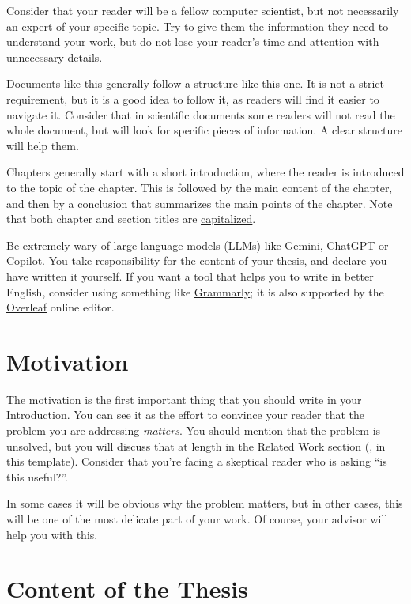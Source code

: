 Consider that your reader will be a fellow computer scientist, but not necessarily an expert
of your specific topic. Try to give them the information they need to understand your work, but
do not lose your reader's time and attention with unnecessary details.

Documents like this generally follow a structure like this one. It is not a strict
requirement, but it is a good idea to follow it, as readers will find it easier to navigate it.
Consider that in scientific documents some readers will not read the whole document,
but will look for specific pieces of information. A clear structure will help them.

Chapters generally start with a short introduction, where the reader is introduced to the topic
of the chapter. This is followed by the main content of the chapter, and then by a conclusion
that summarizes the main points of the chapter. Note that both chapter and section titles are
\href{https://www.grammarly.com/blog/capitalization-in-the-titles/}{capitalized}.

Be extremely wary of large language models (LLMs) like Gemini, ChatGPT or Copilot. You take
responsibility for the content of your thesis, and declare you have written it yourself.
If you want a tool that helps you to write in better English, consider using something like
\href{https://grammarly.com}{Grammarly}; it is also supported by the
\href{https://www.overleaf.com}{Overleaf} online \latex editor.

\section{Motivation}

The motivation is the first important thing that you should write in your Introduction.
You can see it as the effort to convince your reader that the problem you are addressing
\emph{matters}. You should mention that the problem is unsolved, but you will discuss that at
length in the Related Work section (, in this template). Consider that
you're facing a skeptical reader who is asking ``is this useful?''.

In some cases it will be obvious why the problem matters, but in other cases, this will be
one of the most delicate part of your work. Of course, your advisor will help you with this.

\section{Content of the Thesis}

